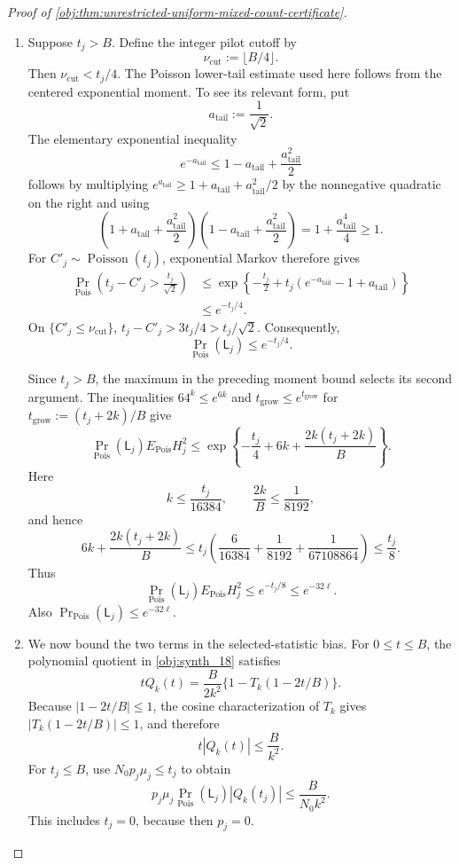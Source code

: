 \documentclass[11pt]{article}
\begin{document}
\begin{proof}[Proof of \cref{obj:thm:unrestricted-uniform-mixed-count-certificate}]
\begin{enumerate}
\item Suppose \(t_j>B\). Define the integer pilot cutoff by
\[
\nu_{\mathrm{cut}}:=\lfloor B/4\rfloor.
\]
Then \(\nu_{\mathrm{cut}}<t_j/4\). The Poisson lower-tail estimate used here
follows from the centered exponential moment. To see its relevant form,
put
\[
a_{\mathrm{tail}}:=\frac1{\sqrt2}.
\]
The elementary exponential inequality
\[
e^{-a_{\mathrm{tail}}}
\le1-a_{\mathrm{tail}}+\frac{a_{\mathrm{tail}}^2}{2}
\]
follows by multiplying
\(e^{a_{\mathrm{tail}}}\ge
1+a_{\mathrm{tail}}+a_{\mathrm{tail}}^2/2\) by the nonnegative quadratic
on the right and using
\[
\left(1+a_{\mathrm{tail}}+\frac{a_{\mathrm{tail}}^2}{2}\right)
\left(1-a_{\mathrm{tail}}+\frac{a_{\mathrm{tail}}^2}{2}\right)
=1+\frac{a_{\mathrm{tail}}^4}{4}\ge1.
\]
For \(C'_j\sim\operatorname{Poisson}(t_j)\), exponential Markov therefore
gives
\[
\begin{aligned}
\Pr_{\mathrm{Pois}}\left(t_j-C'_j>\frac{t_j}{\sqrt2}\right)
&\le
\exp\left\{-\frac{t_j}{2}
+t_j(e^{-a_{\mathrm{tail}}}-1+a_{\mathrm{tail}})\right\}\\
&\le e^{-t_j/4}.
\end{aligned}
\]
On \(\{C'_j\le\nu_{\mathrm{cut}}\}\),
\(t_j-C'_j>3t_j/4>t_j/\sqrt2\). Consequently,
\[
\Pr_{\mathrm{Pois}}(\mathsf L_j)\le e^{-t_j/4}.
\]

Since \(t_j>B\), the maximum in the preceding moment bound selects its
second argument. The inequalities \(64^k\le e^{6k}\) and
\(t_{\mathrm{grow}}\le e^{t_{\mathrm{grow}}}\) for
\(t_{\mathrm{grow}}:=(t_j+2k)/B\) give
\[
\Pr_{\mathrm{Pois}}(\mathsf L_j)E_{\mathrm{Pois}}H_j^2
\le
\exp\left\{-\frac{t_j}{4}
+6k+\frac{2k(t_j+2k)}{B}\right\}.
\]
Here
\[
k\le\frac{t_j}{16384},
\qquad \frac{2k}{B}\le\frac1{8192},
\]
and hence
\[
6k+\frac{2k(t_j+2k)}B
\le
t_j\left(\frac6{16384}+\frac1{8192}
+\frac1{67108864}\right)
\le\frac{t_j}{8}.
\]
Thus
\[
\Pr_{\mathrm{Pois}}(\mathsf L_j)E_{\mathrm{Pois}}H_j^2
\le e^{-t_j/8}\le e^{-32\ell}.
\]
Also \(\Pr_{\mathrm{Pois}}(\mathsf L_j)\le e^{-32\ell}\).

\item We now bound the two terms in the selected-statistic bias.
For \(0\le t\le B\), the polynomial quotient in
\cref{obj:synth_18} satisfies
\[
tQ_k(t)=\frac{B}{2k^2}\{1-T_k(1-2t/B)\}.
\]
Because \(|1-2t/B|\le1\), the cosine characterization of \(T_k\) gives
\(|T_k(1-2t/B)|\le1\), and therefore
\[
t|Q_k(t)|\le\frac B{k^2}.
\]
For \(t_j\le B\), use \(N_0p_j\mu_j\le t_j\) to obtain
\[
p_j\mu_j
\Pr_{\mathrm{Pois}}(\mathsf L_j)|Q_k(t_j)|
\le\frac{B}{N_0k^2}.
\]
This includes \(t_j=0\), because then \(p_j=0\).


\end{enumerate}
\end{proof}
\end{document}

